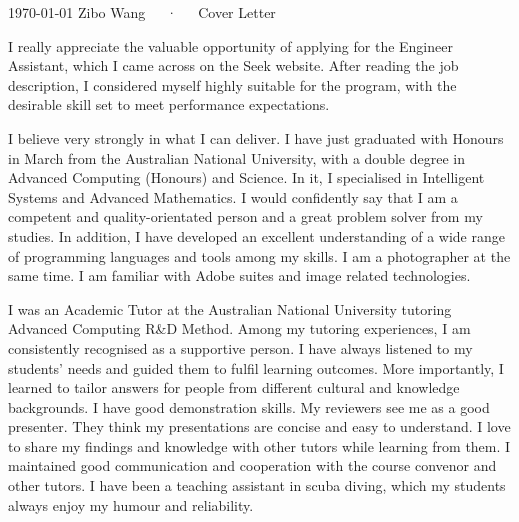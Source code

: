 \documentclass[11pt, a4paper]{awesome-cv}
\begin{document}
\makecvheader[R]

\makecvfooter
  {\today}
  {Zibo Wang~~~·~~~Cover Letter}
  {}

\makelettertitle

\begin{cvletter}

I really appreciate the valuable opportunity of applying for the Engineer Assistant, which I came across on the Seek website. After reading the job description, I considered myself highly suitable for the program, with the desirable skill set to meet performance expectations.


I believe very strongly in what I can deliver. I have just graduated with Honours in March from the Australian National University, with a double degree in Advanced Computing (Honours) and Science. In it, I specialised in Intelligent Systems and Advanced Mathematics. I would confidently say that I am a competent and quality-orientated person and a great problem solver from my studies. In addition, I have developed an excellent understanding of a wide range of programming languages and tools among my skills. I am a photographer at the same time. I am familiar with Adobe suites and image related technologies.

I was an Academic Tutor at the Australian National University tutoring Advanced Computing R\&D Method. Among my tutoring experiences, I am consistently recognised as a supportive person. I have always listened to my students' needs and guided them to fulfil learning outcomes. More importantly, I learned to tailor answers for people from different cultural and knowledge backgrounds. I have good demonstration skills. My reviewers see me as a good presenter. They think my presentations are concise and easy to understand. I love to share my findings and knowledge with other tutors while learning from them. I maintained good communication and cooperation with the course convenor and other tutors. I have been a teaching assistant in scuba diving, which my students always enjoy my humour and reliability.


\end{cvletter}
\end{document}
